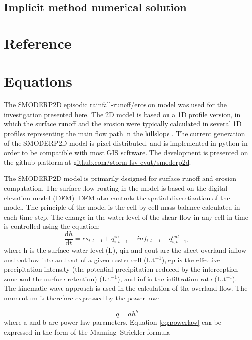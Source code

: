     \subsection{Implicit method numerical solution}

\section{Reference}



\section{Equations}


The SMODERP2D episodic rainfall-runoff/erosion model was used for the
investigation presented here. The 2D model is based on a 1D profile version, in
which the surface runoff and the erosion were typically calculated in several
1D profiles representing the main flow path in the hillslope \cite{Dostal2000}.
The current generation of the SMODERP2D model is pixel distributed, and is
implemented in python in order to be compatible with most GIS software. The
development is presented on the github platform at
\href{https://github.com/storm-fsv-cvut/smoderp2d}{github.com/storm-fsv-cvut/smoderp2d}.

The SMODERP2D model is primarily designed for surface runoff and erosion
computation. The surface flow routing in the model is based on the digital
elevation model (DEM). DEM also controls the spatial discretization of the
model. The principle of the model is the cell-by-cell mass balance calculated
in each time step. The change in the water level of the shear flow in any cell
in time is controlled using the equation: 
\begin{equation} 
\frac{\mathrm{d}h}{\mathrm{d}t} = es_{i,t-1} + q^{in}_{i,t-1} - inf_{i,t-1} - q^{out}_{i,t-1},
\label{eq:bilance}
\end{equation}
where h is the surface water level (L), qin and qout are the sheet overland
inflow and outflow into and out of a given raster cell ($\mathrm{L.t^{-1}}$),
ep is the effective precipitation intensity (the potential precipitation
reduced by the interception zone and the surface retention)
($\mathrm{L.t^{-1}}$), and inf is the infiltration rate ($\mathrm{L.t^{-1}}$).
The kinematic wave approach is used in the calculation of the overland flow.
The momentum is therefore expressed by the power-law:

\begin{equation} 
q = ah^b
\label{eq:powerlaw}
\end{equation}
where a and b are power-law parameters. Equation \ref{eq:powerlaw} can be expressed in the form of the Manning–Strickler formula


